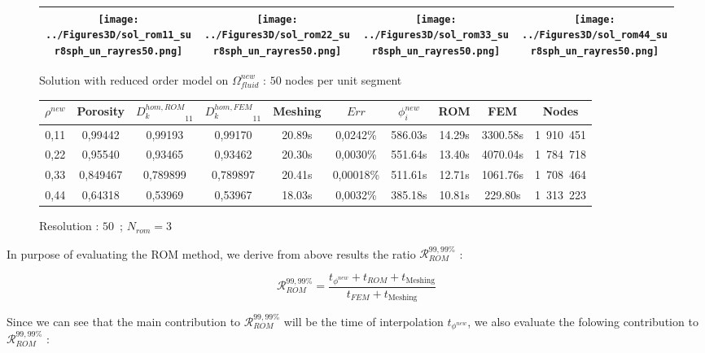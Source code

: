 {\begin{figure}[H]%
%
\begin{center}
\begin{tabular}{|c|c|c|c|}
\hline
\texttt{[image: ../Figures3D/sol\_rom11\_sur8sph\_un\_rayres50.png]}%
&%
\texttt{[image: ../Figures3D/sol\_rom22\_sur8sph\_un\_rayres50.png]}%
&%
\texttt{[image: ../Figures3D/sol\_rom33\_sur8sph\_un\_rayres50.png]}%
&%
\texttt{[image: ../Figures3D/sol\_rom44\_sur8sph\_un\_rayres50.png]}%
\\
\hline
\end{tabular}
\end{center}
%
\caption{Solution with reduced order model on $\Omega_{fluid}^{new}$ : $50$ nodes per unit segment}
\end{figure}

\begin{figure}[H]%
%
\begin{center}
\begin{tabular}{|c|c||c|c||c|c||c|c||c||c|}
\hline
\rowcolor{lightgray} $\rho^{new}$&Porosity&${D_k^{hom,ROM}}_{11}$&${D_k^{hom,FEM}}_{11}$&Meshing&$Err$&$\phi_i^{new}$&ROM&FEM&Nodes\\
\hline
0,11&0,99442&0,99193&0,99170&20.89s&0,0242\%&586.03s&14.29s&3300.58s&1\ 910\ 451\\
\hline
0,22&0,95540&0,93465&0,93462&20.30s&0,0030\%&551.64s&13.40s&4070.04s&1\ 784\ 718\\
\hline
0,33&0,849467&0,789899&0,789897&20.41s&0,00018\%&511.61s&12.71s&1061.76s&1\ 708\ 464\\
\hline
0,44&0,64318&0,53969&0,53967&18.03s&0,0032\%&385.18s&10.81s&229.80s&1\ 313\ 223\\
\hline
\end{tabular}
\end{center}
\caption{Resolution : $50$\ ; $N_{rom}=3$}
%
\end{figure}

\ligneinter
In purpose of evaluating the ROM method, we derive from above results the ratio $\mathcal{R}_{ROM}^{99,99\%}$ :

\begin{equation}
\label{eval_rom}
\mathcal{R}_{ROM}^{99,99\%}=\dfrac{t_{\phi^{new}}+t_{ROM}+t_{\text{Meshing}}}{t_{FEM}+t_{\text{Meshing}}}
\end{equation}

Since we can see that the main contribution to $\mathcal{R}_{ROM}^{99,99\%}$ will be the time of interpolation $t_{\phi^{new}}$, %
we also evaluate the folowing contribution to $\mathcal{R}_{ROM}^{99,99\%}$ :

}
